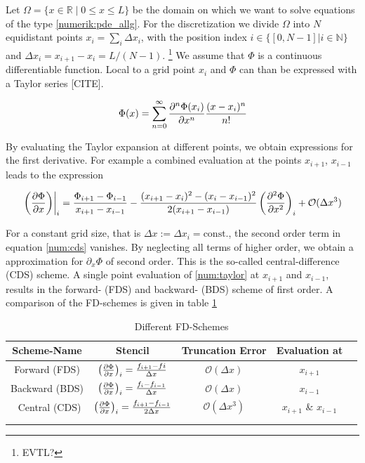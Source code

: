 Let $\Omega = \{x \in \mathbb{R} \;|\; 0 \leq x \leq L\}$ be the domain on which we want to solve equations of the type \ref{numerik:pde_allg}.
For the discretization we divide $\Omega$ into $N$ equidistant points $x_i = \sum_i \Delta x_i$, with the position index ${i\in\{[0, N-1]|i\in\mathbb{N}\}}$
and $\Delta x_i = x_{i+1} - x_i = L/(N-1)$.
\footnote{EVTL?}
We assume that $\Phi$ is a  continuous differentiable function.
Local to a grid point $x_i$ and $\Phi$ can than be expressed with a Taylor series [CITE].

\begin{align}
    \label{num:taylor}
    \Phi(x) = \sum_{n=0}^{\infty} \pdn[^n\Phi(x_i)]{x^n} \frac{(x - x_i)^n}{n!}
\end{align}

By evaluating the Taylor expansion at different points, we obtain expressions for the first derivative. For example
a combined evaluation at the points $x_{i+1}$, $x_{i-1}$ leads to the expression

\begin{align}
    \label{num:cds}
    \left.\left(\pdn[\Phi]{x}\right)\right|_{i} = \frac{\Phi_{i+1} - \Phi_{i-1}}{x_{i+1} - x_{i-1}}
     - \frac{(x_{i+1} - x_i)^2 - (x_i - x_{i-1})^2}{2 (x_{i+1} - x_{i-1})}\left(\pdn[^2\Phi]{x^2}\right)_i + \mathcal{O}(\Delta x^3)
\end{align}

For a constant grid size, that is $\Delta x := \Delta x_i = \text{const.}$, the second order term in equation \ref{num:cds} vanishes.
By neglecting all terms of higher order, we obtain a approximation for $\partial_x \Phi$ of second order.
This is the so-called central-difference (CDS) scheme. A single point evaluation of \ref{num:taylor} at $x_{i+1}$ and $x_{i-1}$, results in the forward- (FDS) and
backward- (BDS) scheme of first order. A comparison of the FD-schemes is given in table \ref{num:df_table}


\bgroup\large
\begin{table}[!tbp]
\centering
\def\arraystretch{2.2}%
\begin{tabular}{c c c c c}\toprule
Scheme-Name & Stencil & Truncation Error & Evaluation at\\[0.5ex]
\midrule
Forward  (FDS) & $\left(\pdn[\Phi]{x}\right)_i =  \frac{f_{i+1} - f{i}}   {\Delta x}$ & $\mathcal{O}(\Delta x)$  &$x_{i+1}$\\
Backward (BDS) & $\left(\pdn[\Phi]{x}\right)_i = \frac{f_{i}    - f_{i-1}}{\Delta x}$  &$ \mathcal{O}(\Delta x)$ & $x_{i-1}$\\\
Central  (CDS) & $\left(\pdn[\Phi]{x}\right)_i = \frac{f_{i+1}  - f_{i-1}}{2\Delta x}$ &$ \mathcal{O}(\Delta x^3)$& $x_{i+1}$ \& $x_{i-1}$\\
\\
\bottomrule
\label{num:df_table}
\end{tabular}
\caption{Different FD-Schemes}
\end{table}
\egroup

